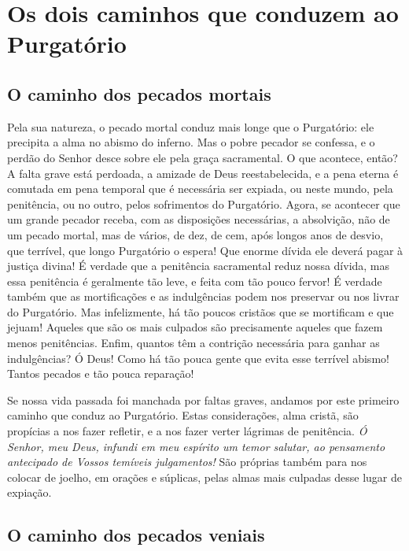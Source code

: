 \renewcommand{\thechapterdisplay}{Décimo dia}
\renewcommand{\thechapterrunner}{Os dois caminhos que conduzem ao Purgatório}
\chapter[Décimo dia --- Os dois caminhos que conduzem ao Purgatório]{Os dois caminhos que conduzem ao Purgatório}
\section*{O caminho dos pecados mortais}

Pela sua natureza, o pecado mortal conduz mais longe que o Purgatório: ele precipita a alma no abismo do inferno. Mas o pobre pecador se confessa, e o perdão do Senhor desce sobre ele pela graça sacramental. O que acontece, então? A falta grave está perdoada, a amizade de Deus reestabelecida, e a pena eterna é comutada em pena temporal que é necessária ser expiada, ou neste mundo, pela penitência, ou no outro, pelos sofrimentos do Purgatório. Agora, se acontecer que um grande pecador receba, com as disposições necessárias, a absolvição, não de um pecado mortal, mas de vários, de dez, de cem, após longos anos de desvio, que terrível, que longo Purgatório o espera! Que enorme dívida ele deverá pagar à justiça divina! É verdade que a penitência sacramental reduz nossa dívida, mas essa penitência é geralmente tão leve, e feita com tão pouco fervor! É verdade também que as mortificações e as indulgências podem nos preservar ou nos livrar do Purgatório. Mas infelizmente, há tão poucos cristãos que se mortificam e que jejuam! Aqueles que são os mais culpados são precisamente aqueles que fazem menos penitências. Enfim, quantos têm a contrição necessária para ganhar as indulgências? Ó Deus! Como há tão pouca gente que evita esse terrível abismo! Tantos pecados e tão pouca reparação!

Se nossa vida passada foi manchada por faltas graves, andamos por este primeiro caminho que conduz ao Purgatório. Estas considerações, alma cristã, são propícias a nos fazer refletir, e a nos fazer verter lágrimas de penitência. \textit{Ó Senhor, meu Deus, infundi em meu espírito um temor salutar, ao pensamento antecipado de Vossos temíveis julgamentos!} São próprias também para nos colocar de joelho, em orações e súplicas, pelas almas mais culpadas desse lugar de expiação.


\section*{O caminho dos pecados veniais}

